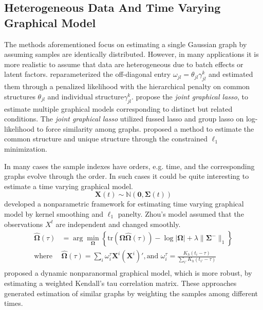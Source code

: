 \documentclass[11pt]{article}
\newcommand{\N}{\mathbb N}
\newcommand{\bX}{\mathbf X}
\newcommand{\bOmega}{{\boldsymbol{\Omega}}}
\newcommand{\bSigma}{{\boldsymbol{\Sigma}}}
\begin{document}
 
\subsection{Heterogeneous Data And Time Varying Graphical Model}
The methods aforementioned focus on estimating a single Gaussian graph by assuming samples are identically distributed. However, in many applications it is more realistic to assume that data are heterogeneous due to batch effects or latent factors. \cite{guo2011joint} reparameterized the off-diagonal entry $\omega_{jl} = \theta_{jl} \gamma_{jl}^{k}$ and estimated them through a penalized likelihood with the hierarchical penalty on common structures $\theta_{jl}$ and individual structure$\gamma_{jl}^{k}$. \cite{danaher2014joint} propose the \emph{joint graphical lasso}, to estimate multiple graphical models corresponding to distinct but related conditions. The \emph{joint graphical lasso} utilized fussed lasso and group lasso on log-likelihood to force similarity among graphs. \cite{lee2015joint} proposed a method to estimate the common structure and unique structure through the constrained $\ell_1$ minimization.

In many cases the sample indexes have orders, e.g. time, and the corresponding graphs evolve through the order. In such cases it could be quite interesting to estimate a time varying graphical model.
\begin{equation}
	\label{eq:timevarygraph}
	\bX(t) \sim \N(\mathbf{0}, \bSigma(t))
\end{equation}
\cite{zhou2010time} developed a nonparametric framework for estimating time varying graphical model by kernel smoothing and $\ell_1$ panelty. Zhou's model assumed that the observations $X^t$ are independent and changed smoothly. 
\begin{equation}
	\label{eq:kernel_likelihood}
	\begin{aligned}
	\hat{\bOmega}(\tau) &= \arg\min_{\bOmega} \left\{ \text{tr}(\bOmega \hat{\bOmega}(\tau)) - \log|\bOmega| + \lambda\|\bSigma^{-}\|_1 \right\}\\
	\text{where }& \hat{\bOmega}(\tau) = \sum_i \omega_i^{\tau} \bX^i (\bX^i)', \text{and }\omega_i^{\tau} = \frac{K_h(t_i - \tau)}{\sum_{i'} K_h(t_{i'}- \tau)} \\
	\end{aligned}
\end{equation}
\cite{lu2015post} proposed a dynamic nonparanormal graphical model, which is more robust, by estimating a weighted Kendall's tau correlation matrix. These approaches generated estimation of similar graphs by weighting the samples among different times.
\end{document}
